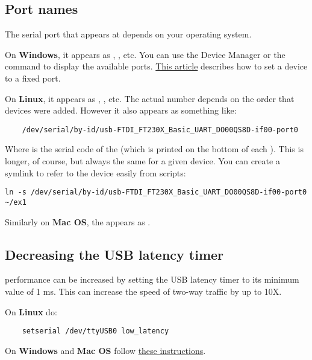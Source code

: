\subsection{Port names}

The serial port that \device{} appears at depends on your operating system.

On \textbf{Windows}, it appears as , ,  etc.
You can use the Device Manager or the  command to display the available ports.
\href{https://plugable.com/2011/07/04/how-to-change-the-com-port-for-a-usb-serial-adapter-on-windows-7/}{This article}
describes how to set a device to a fixed port.

On \textbf{Linux}, it appears as , ,  etc.
The actual number depends on the order that devices were added.
However it also appears as something like:
\begin{lstlisting}
    /dev/serial/by-id/usb-FTDI_FT230X_Basic_UART_DO00QS8D-if00-port0
\end{lstlisting}
Where  is the serial code of the \device{} (which is printed on the bottom of each \device{}).
This is longer, of course, but always the same for a given device.
You can create a symlink to refer to the device easily from scripts:

\begin{lstlisting}
ln -s /dev/serial/by-id/usb-FTDI_FT230X_Basic_UART_DO00QS8D-if00-port0 ~/ex1
\end{lstlisting}

Similarly on \textbf{Mac OS}, the \device{} appears as .

\subsection{Decreasing the USB latency timer}

\device{} performance can be increased by setting the USB latency timer to its minimum value of 1 ms.
This can increase the speed of two-way traffic by up to 10X.

On \textbf{Linux} do:

\begin{lstlisting}
    setserial /dev/ttyUSB0 low_latency
\end{lstlisting}

On \textbf{Windows} and \textbf{Mac OS} follow
\href{https://projectgus.com/2011/10/notes-on-ftdi-latency-with-arduino/}{these instructions}.


